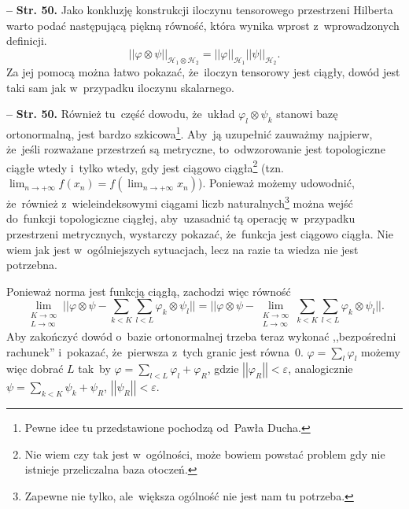\documentclass[a4paper,11pt]{article}
\newcommand{\spaceFour}{0.5em}
\newcommand{\mc}{\mathcal}
\newcommand{\ra}{\rightarrow}
\newcommand{\wtw}{wtedy i~tylko wtedy}
\newcommand{\veps}{\varepsilon}
\newcommand{\vp}{\varphi}
\newcommand{\Hc}{\mc{H}}
\newcommand{\ot}{\otimes}
\newcommand{\Lim}{\lim\limits}
\newcommand{\Sum}{\sum\limits}
\newcommand{\norm}[1]{\left|\left| #1 \right|\right|}
\newcommand{\tb}{\textbf}
\newcommand{\noi}{\noindent}
\newcommand{\start}{\noi \tb{--} {}}
\newcommand{\Str}[1]{\tb{Str. #1.}}
\begin{document}

\vspace{\spaceFour}


\start \Str{50} Jako konkluzję konstrukcji iloczynu tensorowego
przestrzeni Hilberta warto podać następującą piękną równość, która
wynika wprost z~wprowadzonych definicji.
\begin{equation*}
  \norm{ \vp \ot \psi }_{ \Hc_{ 1 } \ot \Hc_{ 2 } }
  = \norm{ \vp }_{ \Hc_{ 1 } } \norm{ \psi }_{ \Hc_{ 2 } }.
\end{equation*}
Za jej pomocą można łatwo pokazać, że~iloczyn tensorowy jest ciągły,
dowód jest taki sam jak w~przypadku iloczynu skalarnego. %

\vspace{\spaceFour}


\start \Str{50} Również tu~część dowodu, że~układ
$\vp_{ l } \ot \psi_{ k }$ stanowi bazę ortonormalną, jest bardzo
szkicowa\footnote{Pewne idee tu przedstawione pochodzą od~Pawła
  Ducha.}. Aby~ją uzupełnić zauważmy najpierw, że~jeśli rozważane
przestrzeń są metryczne, to~odwzorowanie jest topologiczne ciągłe
\wtw, gdy jest ciągowo ciągła\footnote{Nie wiem czy tak jest
  w~ogólności, może bowiem powstać problem gdy nie istnieje
  przeliczalna baza otoczeń.} (tzn.
$\lim_{ n \ra +\infty } f( x_{ n } ) = f( \lim_{ n \ra +\infty } x_{ n
} )$). Ponieważ możemy udowodnić, że~również z~wieleindeksowymi
ciągami liczb naturalnych\footnote{Zapewne nie tylko, ale~większa
  ogólność nie jest nam tu potrzeba.} można wejść do~funkcji
topologiczne ciągłej, aby~uzasadnić tą operację w~przypadku
przestrzeni metrycznych, wystarczy pokazać, że~funkcja jest ciągowo
ciągła. Nie wiem jak jest w~ogólniejszych sytuacjach, lecz na razie ta
wiedza nie jest potrzebna.

Ponieważ norma jest funkcją ciągłą, zachodzi więc równość
\begin{equation*}
  \Lim_{ \substack{ K \ra \infty \\ L \ra \infty } } || \vp \ot \psi
  - \Sum_{ k < K }\Sum_{ l < L } \vp_{ k } \ot \psi_{ l } ||
  = || \vp \ot \psi - \Lim_{ \substack{ K \ra \infty \\ L \ra \infty } } \Sum_{ k < K }
  \Sum_{ l < L } \vp_{ k } \ot \psi_{ l } ||.
\end{equation*}
Aby zakończyć dowód o~bazie ortonormalnej trzeba teraz wykonać
,,bezpośredni rachunek'' i~pokazać, że~pierwsza z~tych granic jest
równa~0. $\vp = \sum_{ l } \vp_{ l }$ możemy więc dobrać $L$ tak~by
$\vp = \sum_{ l < L } \vp_{ l } + \vp_{ R }$, gdzie
$\norm{ \vp_{ R } } < \veps$, analogicznie
$\psi = \sum_{ k < K } \psi_{ k } + \psi_{ R }$,
$\norm{ \psi_{ R } } < \veps$.
\end{document}
